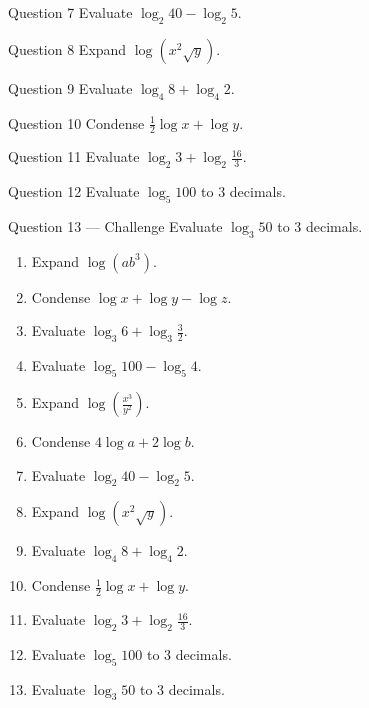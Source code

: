 \documentclass[11pt]{article}
\begin{document}
\begin{qbox}{Question 7}
Evaluate $\log_2 40-\log_2 5$.\workspace{2.4cm}
\end{qbox}

\begin{qbox}{Question 8}
Expand $\log(x^2\sqrt{y})$.\workspace{2.4cm}
\end{qbox}

\begin{qbox}{Question 9}
Evaluate $\log_4 8+\log_4 2$.\workspace{2.4cm}
\end{qbox}

\begin{qbox}{Question 10}
Condense $\tfrac12\log x+\log y$.\workspace{2.4cm}
\end{qbox}

\begin{qbox}{Question 11}
Evaluate $\log_2 3+\log_2 \tfrac{16}{3}$.\workspace{2.4cm}
\end{qbox}

\begin{qbox}{Question 12}
Evaluate $\log_5 100$ to 3 decimals.\workspace{2.4cm}
\end{qbox}

\begin{qbox}{Question 13 --- Challenge}
Evaluate $\log_3 50$ to 3 decimals.\workspace{3cm}
\end{qbox}

\clearpage
{}

\begin{recapbox}
\begin{multicols}{2}
\small
\begin{enumerate}[leftmargin=*,itemsep=3pt]
  \item Expand $\log(ab^3)$.
  \item Condense $\log x+\log y-\log z$.
  \item Evaluate $\log_3 6+\log_3 \tfrac32$.
  \item Evaluate $\log_5 100-\log_5 4$.
  \item Expand $\log\!\left(\tfrac{x^3}{y^2}\right)$.
  \item Condense $4\log a+2\log b$.
  \item Evaluate $\log_2 40-\log_2 5$.
  \item Expand $\log(x^2\sqrt{y})$.
  \item Evaluate $\log_4 8+\log_4 2$.
  \item Condense $\tfrac12\log x+\log y$.
  \item Evaluate $\log_2 3+\log_2 \tfrac{16}{3}$.
  \item Evaluate $\log_5 100$ to 3 decimals.
  \item Evaluate $\log_3 50$ to 3 decimals.
\end{enumerate}
\end{multicols}
\end{recapbox}
\end{document}
